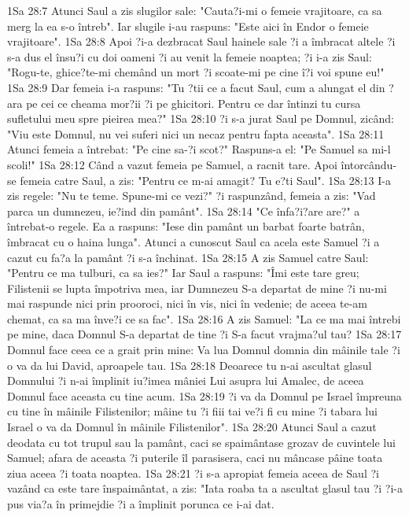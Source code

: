 1Sa 28:7  Atunci Saul a zis slugilor sale: "Cauta?i-mi o femeie vrajitoare, ca sa merg la ea s-o întreb". Iar slugile i-au raspuns: "Este aici în Endor o femeie vrajitoare".
1Sa 28:8  Apoi ?i-a dezbracat Saul hainele sale ?i a îmbracat altele ?i s-a dus el însu?i cu doi oameni ?i au venit la femeie noaptea; ?i i-a zis Saul: "Rogu-te, ghice?te-mi chemând un mort ?i scoate-mi pe cine î?i voi spune eu!"
1Sa 28:9  Dar femeia i-a raspuns: "Tu ?tii ce a facut Saul, cum a alungat el din ?ara pe cei ce cheama mor?ii ?i pe ghicitori. Pentru ce dar întinzi tu cursa sufletului meu spre pieirea mea?"
1Sa 28:10  ?i s-a jurat Saul pe Domnul, zicând: "Viu este Domnul, nu vei suferi nici un necaz pentru fapta aceasta".
1Sa 28:11  Atunci femeia a întrebat: "Pe cine sa-?i scot?" Raspuns-a el: "Pe Samuel sa mi-l scoli!"
1Sa 28:12  Când a vazut femeia pe Samuel, a racnit tare. Apoi întorcându-se femeia catre Saul, a zis: "Pentru ce m-ai amagit? Tu e?ti Saul".
1Sa 28:13  I-a zis regele: "Nu te teme. Spune-mi ce vezi?" ?i raspunzând, femeia a zis: "Vad parca un dumnezeu, ie?ind din pamânt".
1Sa 28:14  "Ce înfa?i?are are?" a întrebat-o regele. Ea a raspuns: "Iese din pamânt un barbat foarte batrân, îmbracat cu o haina lunga". Atunci a cunoscut Saul ca acela este Samuel ?i a cazut cu fa?a la pamânt ?i s-a închinat.
1Sa 28:15  A zis Samuel catre Saul: "Pentru ce ma tulburi, ca sa ies?" Iar Saul a raspuns: "Îmi este tare greu; Filistenii se lupta împotriva mea, iar Dumnezeu S-a departat de mine ?i nu-mi mai raspunde nici prin prooroci, nici în vis, nici în vedenie; de aceea te-am chemat, ca sa ma înve?i ce sa fac".
1Sa 28:16  A zis Samuel: "La ce ma mai întrebi pe mine, daca Domnul S-a departat de tine ?i S-a facut vrajma?ul tau?
1Sa 28:17  Domnul face ceea ce a grait prin mine: Va lua Domnul domnia din mâinile tale ?i o va da lui David, aproapele tau.
1Sa 28:18  Deoarece tu n-ai ascultat glasul Domnului ?i n-ai împlinit iu?imea mâniei Lui asupra lui Amalec, de aceea Domnul face aceasta cu tine acum.
1Sa 28:19  ?i va da Domnul pe Israel împreuna cu tine în mâinile Filistenilor; mâine tu ?i fiii tai ve?i fi cu mine ?i tabara lui Israel o va da Domnul în mâinile Filistenilor".
1Sa 28:20  Atunci Saul a cazut deodata cu tot trupul sau la pamânt, caci se spaimântase grozav de cuvintele lui Samuel; afara de aceasta ?i puterile îl parasisera, caci nu mâncase pâine toata ziua aceea ?i toata noaptea.
1Sa 28:21  ?i s-a apropiat femeia aceea de Saul ?i vazând ca este tare înspaimântat, a zis: "Iata roaba ta a ascultat glasul tau ?i ?i-a pus via?a în primejdie ?i a împlinit porunca ce i-ai dat.
